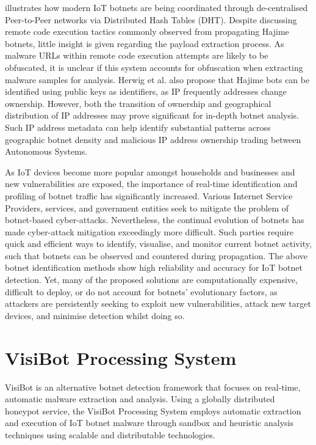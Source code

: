 \citet{Herwig2019} illustrates how modern IoT botnets are being coordinated through de-centralised Peer-to-Peer networks via Distributed Hash Tables (DHT). Despite discussing remote code execution tactics commonly observed from propagating Hajime botnets, little insight is given regarding the payload extraction process. As malware URLs within remote code execution attempts are likely to be obfuscated, it is unclear if this system accounts for obfuscation when extracting malware samples for analysis. Herwig et al. also propose that Hajime bots can be identified using public keys as identifiers, as IP frequently addresses change ownership. However, both the transition of ownership and geographical distribution of IP addresses may prove significant for in-depth botnet analysis. Such IP address metadata can help identify substantial patterns across geographic botnet density and malicious IP address ownership trading between Autonomous Systems. 

As IoT devices become more popular amongst households and businesses and new vulnerabilities are exposed, the importance of real-time identification and profiling of botnet traffic has significantly increased. Various Internet Service Providers, services, and government entities seek to mitigate the problem of botnet-based cyber-attacks. Nevertheless, the continual evolution of botnets has made cyber-attack mitigation exceedingly more difficult. Such parties require quick and efficient ways to identify, visualise, and monitor current botnet activity, such that botnets can be observed and countered during propagation. The above botnet identification methods show high reliability and accuracy for IoT botnet detection. Yet, many of the proposed solutions are computationally expensive, difficult to deploy, or do not account for botnets' evolutionary factors, as attackers are persistently seeking to exploit new vulnerabilities, attack new target devices, and minimise detection whilst doing so. 

\section{VisiBot Processing System}

VisiBot is an alternative botnet detection framework that focuses on real-time, automatic malware extraction and analysis. Using a globally distributed honeypot service, the VisiBot Processing System employs automatic extraction and execution of IoT botnet malware through sandbox and heuristic analysis techniques using scalable and distributable technologies. 

